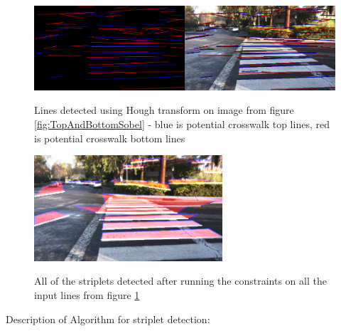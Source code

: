\documentclass[12pt]{ucthesis}
\newcommand{\captionfonts}{\small\bf\ssp}
\begin{document}
\begin{figure}
\begin{center}
\includegraphics[width=14cm]{HoughLinesAfterMerge.png}
\captionfonts
\caption[This is a figure]{Lines detected using Hough transform on image from figure \ref{fig:TopAndBottomSobel} - blue is potential crosswalk top lines, red is potential crosswalk bottom lines}
\label{fig:HoughLinesAfterMerge}
\end{center}
\end{figure}

\begin{figure}
\begin{center}
\includegraphics[width=7cm]{UnculledStriplets.png}
\captionfonts
\caption[This is a figure]{All of the striplets detected after running the constraints on all the input lines from figure \ref{fig:HoughLinesAfterMerge}}
\label{fig:UnculledStriplets}
\end{center}
\end{figure}

Description of Algorithm for striplet detection:
\end{document}
